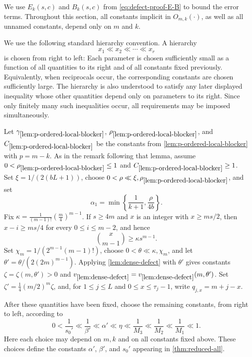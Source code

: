 \documentclass[10pt,a4paper]{article}
\numberwithin{equation}{section}
\theoremstyle{definition}
\begin{document}
We use $E_k(s,c)$ and $B_k(s,c)$ from
\eqref{eq:defect-proof-E-B} to bound the error terms.  Throughout this
section, all constants implicit in $O_{m,k}(\cdot)$, as well as all
unnamed constants, depend only on $m$ and $k$.

We use the following standard hierarchy convention.  A hierarchy
\[
        x_1\ll x_2\ll\cdots\ll x_r
\]
is chosen from right to left: Each parameter is chosen sufficiently
small as a function of all quantities to its right and of all constants
fixed previously.  Equivalently, when reciprocals occur, the
corresponding constants are chosen sufficiently large.  The hierarchy
is also understood to satisfy any later displayed inequality whose
other quantities depend only on parameters to its right.  Since only
finitely many such inequalities occur, all requirements may be imposed
simultaneously.

Let
$\gamma_{\ref{lem:p-ordered-local-blocker}}$,
$\rho_{\ref{lem:p-ordered-local-blocker}}$, and
$C_{\ref{lem:p-ordered-local-blocker}}$
be the constants from \cref{lem:p-ordered-local-blocker} with $p=m-k$.
As in the remark following that lemma, assume
$0<\rho_{\ref{lem:p-ordered-local-blocker}}\le1$ and
$C_{\ref{lem:p-ordered-local-blocker}}\ge1$.
Set $\xi=1/(2(bL+1))$, choose
$0<\rho\ll \xi,\rho_{\ref{lem:p-ordered-local-blocker}}$, and set
\[
        \alpha_1=
        \min\left\{\frac1{k+1},\frac{\rho}{4b}\right\}.
\]
Fix $\kappa=\frac1{(m-1)!}\left(\frac m4\right)^{m-1}$.
If $s\ge4m$ and $x$ is an integer with $x\ge ms/2$, then
$x-i\ge ms/4$ for every $0\le i\le m-2$, and hence
\begin{equation}\label{eq:defect-kappa-binomial}
        \binom{x}{m-1}\ge\kappa s^{m-1}.
\end{equation}
Set $\chi_m=1/(2^{m-1}(m-1)!)$, choose
$0<\theta\ll\kappa,\chi_m$, and let
$\theta'=\theta/(2(2m)^{m-1})$.
Applying \cref{lem:dense-defect} with $\theta'$ gives constants $\zeta=\zeta(m,\theta')>0$ and $v_{\ref{lem:dense-defect}}
        =v_{\ref{lem:dense-defect}}(m,\theta')$.
Set $\zeta'=\frac14(m/2)^m\zeta$, and, for
$1\le j\le L$ and $0\le x\le\tau_j-1$, write
$q_{j,x}=m+j-x$.

After these quantities have been fixed, choose the remaining constants,
from right to left, according to
\[
        0<
        \frac1{s_0'}
        \ll
        \frac1{\beta'}
        \ll
        \alpha'
        \ll
        \eta
        \ll
        \frac1{M_3}
        \ll
        \frac1{M_2}
        \ll
        \frac1{M_1}
        \ll1.
\]
Here each choice may depend on $m,k$ and on all constants fixed above.
These choices define the constants $\alpha'$, $\beta'$, and $s_0'$
appearing in \cref{thm:reduced-all}.
\end{document}
